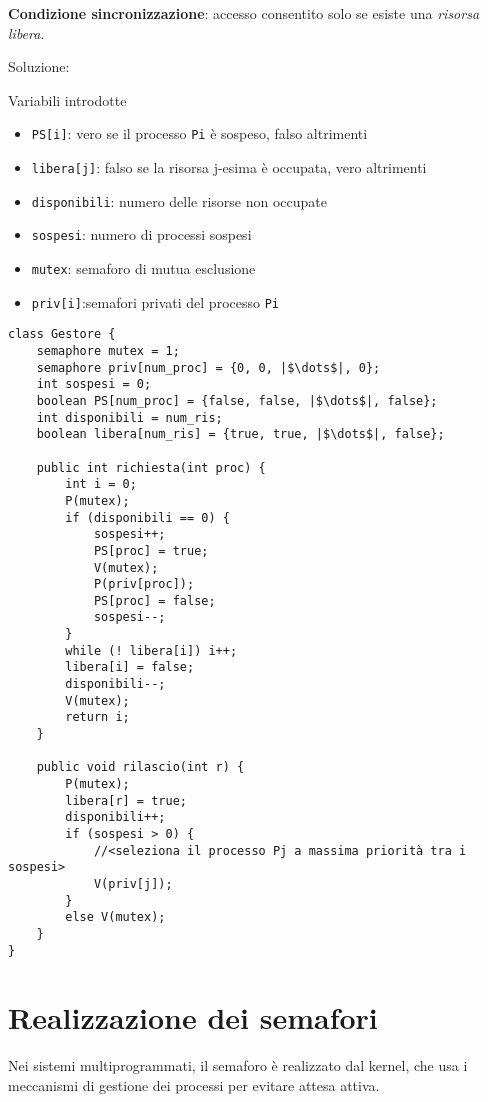 \textbf{Condizione sincronizzazione}: accesso consentito solo se esiste una \textit{risorsa libera}.

Soluzione:

Variabili introdotte
\begin{itemize}
    \item \texttt{PS[i]}: vero se il processo \texttt{Pi} è sospeso, falso altrimenti
    \item \texttt{libera[j]}: falso se la risorsa j-esima è occupata, vero altrimenti
    \item \texttt{disponibili}: numero delle risorse non occupate
    \item \texttt{sospesi}: numero di processi sospesi
    \item \texttt{mutex}: semaforo di mutua esclusione
    \item \texttt{priv[i]}:semafori privati del processo \texttt{Pi}
\end{itemize}

\begin{verbatim}
class Gestore {
    semaphore mutex = 1;
    semaphore priv[num_proc] = {0, 0, |$\dots$|, 0};
    int sospesi = 0;
    boolean PS[num_proc] = {false, false, |$\dots$|, false};
    int disponibili = num_ris;
    boolean libera[num_ris] = {true, true, |$\dots$|, false};

    public int richiesta(int proc) {
        int i = 0;
        P(mutex);
        if (disponibili == 0) {
            sospesi++;
            PS[proc] = true;
            V(mutex);
            P(priv[proc]);
            PS[proc] = false;
            sospesi--;
        }
        while (! libera[i]) i++;
        libera[i] = false;
        disponibili--;
        V(mutex);
        return i;
    }

    public void rilascio(int r) {
        P(mutex);
        libera[r] = true;
        disponibili++;
        if (sospesi > 0) {
            //<seleziona il processo Pj a massima priorità tra i sospesi>
            V(priv[j]);
        }
        else V(mutex);
    }
}
\end{verbatim}

\section{Realizzazione dei semafori}

Nei sistemi multiprogrammati, il semaforo è realizzato dal kernel, che usa i meccanismi di gestione dei processi per evitare attesa attiva.

